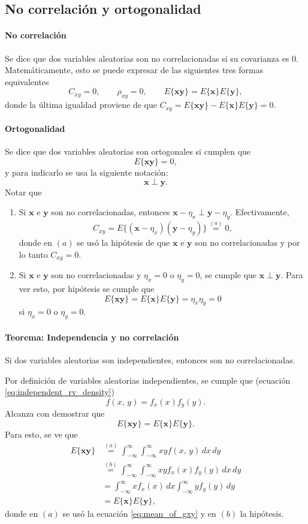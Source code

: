 \documentclass[a4paper]{report}
\newcommand{\x}{\mathbf{x}}
\newcommand{\y}{\mathbf{y}}
\begin{document}
\subsection{No correlación y ortogonalidad}\label{sec:uncorrelation_and_onthogonality}

\paragraph{No correlación} Se dice que dos variables aleatorias son no correlacionadas si su covarianza es 0. Matemáticamente, esto se puede expresar de las siguientes tres formas equivalentes
\[
 C_{xy}=0,\qquad \rho_{xy}=0,\qquad E\{\x\y\}=E\{\x\}E\{\y\},
\]
donde la última igualdad proviene de que \(C_{xy}=E\{\x\y\}-E\{\x\}E\{\y\}=0\).

\paragraph{Ortogonalidad} Se dice que dos variables aleatorias son ortogonales si cumplen que
\[
 E\{\x\y\}=0,
\]
y para indicarlo se usa la siguiente notación:
\[
 \x\perp\y.
\]
Notar que
\begin{enumerate}[\((a)\)]
 \item Si \(\x\) e \(\y\) son no correlacionadas, entonces \(\x-\eta_x\perp\y-\eta_y\). Efectivamente,
 \[
  C_{xy}=E\{(\x-\eta_x)(\y-\eta_y)\}\overset{(a)}{=}0,
 \]
 donde en \((a)\) se usó la hipótesis de que \(\x\) e \(\y\) son no correlacionadas y por lo tanto \(C_{xy}=0\).
 \item Si \(\x\) e \(\y\) son no correlacionadas y \(\eta_x=0\) o \(\eta_y=0\), se cumple que \(\x\perp\y\). Para ver esto, por hipótesis se cumple que
 \[
  E\{\x\y\}=E\{\x\}E\{\y\}=\eta_x\eta_y=0
 \]
 si \(\eta_x=0\) o \(\eta_y=0\).
\end{enumerate}

\paragraph{Teorema: Independencia y no correlación} Si dos variables aleatorias son independientes, entonces son no correlacionadas. 

Por definición de variables aleatorias independientes, se cumple que (ecuación \ref{eq:independent_rv_density})
\[
 f(x,\,y)=f_x(x)f_y(y).
\]
Alcanza con demostrar que 
\[
 E\{\x\y\}=E\{\x\}E\{\y\}.
\]
Para esto, se ve que
\begin{align*}
 E\{\x\y\}&\overset{(a)}{=}\int_{-\infty}^{\infty}\int_{-\infty}^{\infty}xyf(x,\,y)\,dx\,dy\\
  &\overset{(b)}{=}\int_{-\infty}^{\infty}\int_{-\infty}^{\infty}xyf_x(x)f_y(y)\,dx\,dy\\
  &=\int_{-\infty}^{\infty}xf_x(x)\,dx\int_{-\infty}^{\infty}yf_y(y)\,dy\\
  &=E\{\x\}E\{\y\},
\end{align*}
donde en \((a)\) se usó la ecuación \ref{eq:mean_of_gxy} y en \((b)\) la hipótesis.
\end{document}
